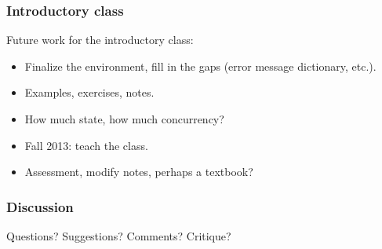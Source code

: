 \documentclass{beamer}
\begin{document}
\begin{frame}
  \frametitle{Introductory class}
Future work for the introductory class:
\begin{itemize}
\item Finalize the environment, fill in the gaps (error message dictionary, etc.).
\item Examples, exercises, notes. 
\item How much state, how much concurrency?
\item Fall 2013: teach the class.
\item Assessment, modify notes, perhaps a textbook?
\end{itemize}
\end{frame}



\begin{frame}
  \frametitle{Discussion}
Questions? Suggestions? Comments? Critique? 
\end{frame}
\end{document}
